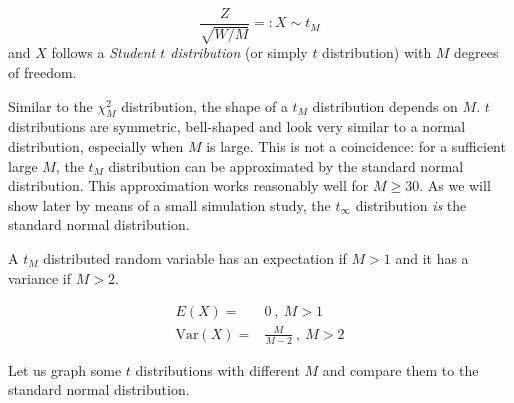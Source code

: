 \documentclass[]{book}
\theoremstyle{definition}
\theoremstyle{definition}
\theoremstyle{definition}
\theoremstyle{remark}
\begin{document}
\[ \frac{Z}{\sqrt{W/M}} =:X \sim t_M \] and \(X\) follows a
\emph{Student \(t\) distribution} (or simply \(t\) distribution) with
\(M\) degrees of freedom.

Similar to the \(\chi^2_M\) distribution, the shape of a \(t_M\)
distribution depends on \(M\). \(t\) distributions are symmetric,
bell-shaped and look very similar to a normal distribution, especially
when \(M\) is large. This is not a coincidence: for a sufficient large
\(M\), the \(t_M\) distribution can be approximated by the standard
normal distribution. This approximation works reasonably well for
\(M\geq 30\). As we will show later by means of a small simulation
study, the \(t_{\infty}\) distribution \emph{is} the standard normal
distribution.

A \(t_M\) distributed random variable has an expectation if \(M>1\) and
it has a variance if \(M>2\).

\begin{align}
  E(X) =& 0 \ , \ M>1 \\
  \text{Var}(X) =& \frac{M}{M-2} \ , \ M>2
\end{align}

Let us graph some \(t\) distributions with different \(M\) and compare
them to the standard normal distribution.
\end{document}
